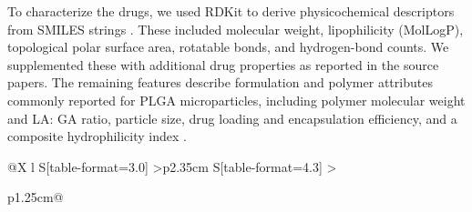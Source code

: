 \documentclass[preprint,12pt,authoryear]{elsarticle}
\begin{document}
To characterize the drugs, we used RDKit to derive physicochemical descriptors from SMILES strings \citep{RDKitZenodo}. These included molecular weight, lipophilicity (MolLogP), topological polar surface area, rotatable bonds, and hydrogen-bond counts. We supplemented these with additional drug properties as reported in the source papers. The remaining features describe formulation and polymer attributes commonly reported for PLGA microparticles, including polymer molecular weight and LA: GA ratio, particle size, drug loading and encapsulation efficiency, and a composite hydrophilicity index \citep{MakadiaSiegel2011, Fredenberg2011, Jain2000, FreibergZhu2004}.

\begin{table}[H]
\caption{Summary statistics of key inputs and targets across 321 formulations (formulation-level means shown). Polymer MW is in kDa; particle size is in $\mu$m; loading and encapsulation are in \%. Peppas $n$ is dimensionless; Peppas $n$ and $K$ are reported for the paired Peppas modeling export ($N=300$, including six high empirical fits with $n>2$). Peppas $K$ was computed after expressing time in hours; because $K$ depends on the fitted exponent $n$, values are descriptive fitted constants rather than directly comparable dimensional quantities across all formulations. \texttt{Burst\_24h} is a unitless fraction. Values slightly above 1 can occur due to assay normalization and digitization noise \citep{Drevon2017WPD}.}
\label{tab:summary_stats}
\centering
\small
\setlength{\tabcolsep}{3pt}
\renewcommand{\arraystretch}{1.05}

\begin{tabularx}{\linewidth}{@{}X l
S[table-format=3.0]
>{\raggedleft\arraybackslash}p{2.35cm}
S[table-format=4.3]
>{\raggedright\arraybackslash}p{1.25cm}@{}}



\end{tabularx}
\end{table}
\end{document}
